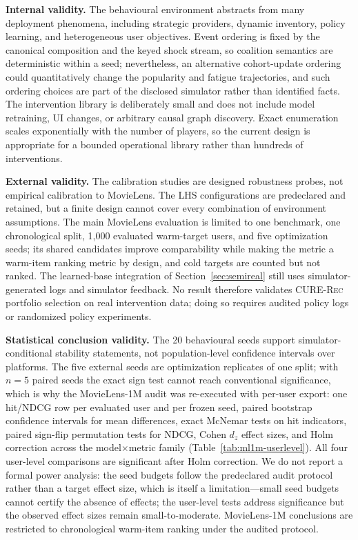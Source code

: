 \documentclass[review]{elsarticle}
\theoremstyle{plain}
\theoremstyle{definition}
\theoremstyle{remark}
\newcommand{\CURE}{\textsc{CURE-Rec}}
\begin{document}
\textbf{Internal validity.} The behavioural environment abstracts from many deployment phenomena, including strategic providers, dynamic inventory, policy learning, and heterogeneous user objectives. Event ordering is fixed by the canonical composition and the keyed shock stream, so coalition semantics are deterministic within a seed; nevertheless, an alternative cohort-update ordering could quantitatively change the popularity and fatigue trajectories, and such ordering choices are part of the disclosed simulator rather than identified facts. The intervention library is deliberately small and does not include model retraining, UI changes, or arbitrary causal graph discovery. Exact enumeration scales exponentially with the number of players, so the current design is appropriate for a bounded operational library rather than hundreds of interventions.

\textbf{External validity.} The calibration studies are designed robustness probes, not empirical calibration to MovieLens. The LHS configurations are predeclared and retained, but a finite design cannot cover every combination of environment assumptions. The main MovieLens evaluation is limited to one benchmark, one chronological split, 1,000 evaluated warm-target users, and five optimization seeds; its shared candidates improve comparability while making the metric a warm-item ranking metric by design, and cold targets are counted but not ranked. The learned-base integration of Section~\ref{sec:semireal} still uses simulator-generated logs and simulator feedback. No result therefore validates \CURE{} portfolio selection on real intervention data; doing so requires audited policy logs or randomized policy experiments.

\textbf{Statistical conclusion validity.} The 20 behavioural seeds support simulator-conditional stability statements, not population-level confidence intervals over platforms. The five external seeds are optimization replicates of one split; with $n=5$ paired seeds the exact sign test cannot reach conventional significance, which is why the MovieLens-1M audit was re-executed with per-user export: one hit/NDCG row per evaluated user and per frozen seed, paired bootstrap confidence intervals for mean differences, exact McNemar tests on hit indicators, paired sign-flip permutation tests for NDCG, Cohen $d_z$ effect sizes, and Holm correction across the model$\times$metric family (Table~\ref{tab:ml1m-userlevel}). All four user-level comparisons are significant after Holm correction. We do not report a formal power analysis: the seed budgets follow the predeclared audit protocol rather than a target effect size, which is itself a limitation---small seed budgets cannot certify the absence of effects; the user-level tests address significance but the observed effect sizes remain small-to-moderate. MovieLens-1M conclusions are restricted to chronological warm-item ranking under the audited protocol.
\end{document}
